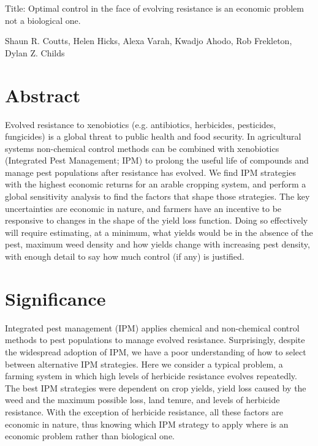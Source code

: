\documentclass[12pt, a4paper]{article}
\begin{document}
Title: Optimal control in the face of evolving resistance is an economic problem not a biological one.

Shaun R. Coutts, Helen Hicks, Alexa Varah, Kwadjo Ahodo, Rob Frekleton, Dylan Z. Childs 

\newpage

\section*{Abstract}
Evolved resistance to xenobiotics (e.g. antibiotics, herbicides, pesticides, fungicides) is a global threat to public health and food security. In agricultural systems non-chemical control methods can be combined with xenobiotics (Integrated Pest Management; IPM) to prolong the useful life of compounds and manage pest populations after resistance has evolved. We find IPM strategies with the highest economic returns for an arable cropping system, and perform a global sensitivity analysis to find the factors that shape those strategies. The key uncertainties are economic in nature, and farmers have an incentive to be responsive to changes in the shape of the yield loss function. Doing so effectively will require estimating, at a minimum, what yields would be in the absence of the pest, maximum weed density and how yields change with increasing pest density, with enough detail to say how much control (if any) is justified.            

\section*{Significance}
Integrated pest management (IPM) applies chemical and non-chemical control methods to pest populations to manage evolved resistance. Surprisingly, despite the widespread adoption of IPM, we have a poor understanding of how to select between alternative IPM strategies. Here we consider a typical problem, a farming system in which high levels of herbicide resistance evolves repeatedly. The best IPM strategies were dependent on crop yields, yield loss caused by the weed and the maximum possible loss, land tenure, and levels of herbicide resistance. With the exception of herbicide resistance, all these factors are economic in nature, thus knowing which IPM strategy to apply where is an economic problem rather than biological one.

\newpage
\end{document}
